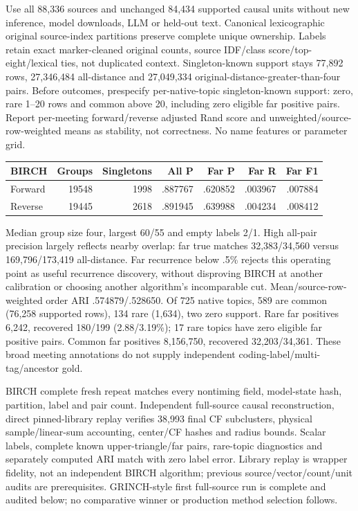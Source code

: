 \documentclass[11pt]{article}
\begin{document}
Use all 88,336 sources and unchanged 84,434 supported causal units without new
inference, model downloads, LLM or held-out text. Canonical lexicographic original
source-index partitions preserve complete unique ownership. Labels retain exact
marker-cleaned original counts, source IDF/class score/top-eight/lexical ties,
not duplicated context. Singleton-known support stays 77,892 rows, 27,346,484
all-distance and 27,049,334 original-distance-greater-than-four pairs. Before
outcomes, prespecify per-native-topic singleton-known support: zero, rare 1--20
rows and common above 20, including zero eligible far positive pairs. Report
per-meeting forward/reverse adjusted Rand score and unweighted/source-row-weighted
means as stability, not correctness. No name features or parameter grid.

\begin{center}
\begin{tabular}{lrrrrrr}
BIRCH & Groups & Singletons & All P & Far P & Far R & Far F1\\\hline
Forward & 19548 & 1998 & .887767 & .620852 & .003967 & .007884\\
Reverse & 19445 & 2618 & .891945 & .639988 & .004234 & .008412
\end{tabular}
\end{center}
Median group size four, largest 60/55 and empty labels 2/1. High all-pair precision
largely reflects nearby overlap: far true matches 32,383/34,560 versus
169,796/173,419 all-distance. Far recurrence below .5\% rejects this operating
point as useful recurrence discovery, without disproving BIRCH at another
calibration or choosing another algorithm's incomparable cut. Mean/source-row-
weighted order ARI .574879/.528650. Of 725 native topics, 589 are common (76,258
supported rows), 134 rare (1,634), two zero support. Rare far positives 6,242,
recovered 180/199 (2.88/3.19\%); 17 rare topics have zero eligible far positive
pairs. Common far positives 8,156,750, recovered 32,203/34,361. These broad
meeting annotations do not supply independent coding-label/multi-tag/ancestor gold.

BIRCH complete fresh repeat matches every nontiming field, model-state hash,
partition, label and pair count. Independent full-source causal reconstruction,
direct pinned-library replay verifies 38,993 final CF subclusters, physical
sample/linear-sum accounting, center/CF hashes and radius bounds. Scalar labels,
complete known upper-triangle/far pairs, rare-topic diagnostics and separately
computed ARI match with zero label error. Library replay is wrapper fidelity,
not an independent BIRCH algorithm; previous source/vector/count/unit audits are
prerequisites. GRINCH-style first full-source run is complete and audited below;
no comparative winner or production method selection follows.
\end{document}
